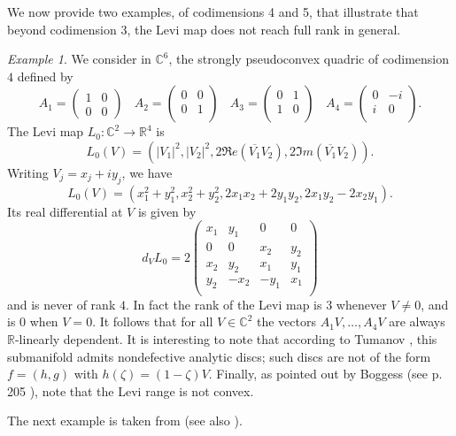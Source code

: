 \documentclass[12pt]{amsart}
\newcommand{\C}{\mathbb C}
\newcommand{\R}{\mathbb R}
\theoremstyle{remark}
\theoremstyle{example}
\newtheorem{example}[theo]{Example}
\theoremstyle{definition}
\numberwithin{equation}{section}
\begin{document}
We now provide two examples, of codimensions 4 and 5,  that illustrate that beyond codimension 3, the Levi map does not reach full rank in general. 

\begin{example}
We consider in $\C^6$, the strongly pseudoconvex quadric of codimension $4$ defined by  
$$A_1=
\begin{pmatrix}
	1& 0  \\ 0 &0  
\end{pmatrix} \ \ \ \ 
A_2=
\begin{pmatrix}
	0 & 0  \\  0 & 1 \\ 
\end{pmatrix}\ \ \ \ 
A_3=
\begin{pmatrix}
	0& 1  \\  1 & 0 \\
\end{pmatrix}\ \ \ \  
A_4=
\begin{pmatrix}
	0& -i  \\ i  & 0 \\
\end{pmatrix}.$$
The Levi map $L_0: \C^2 \to \R^4$ is 
$$L_0(V)=(|V_1|^2,|V_2|^2,2\Re e (\overline{V_1}V_2),2\Im m (\overline{V_1}V_2)).$$ 
Writing $V_j=x_j+iy_j$, we have  
$$L_0(V)=(x_1^2+y_1^2,x_2^2+y_2^2,2x_1x_2+2y_1y_2,2x_1y_2-2x_2y_1).$$  
Its real differential at $V$ is given by 
$$d_VL_0=2
\begin{pmatrix}
x_1& y_1 & 0 & 0     \\ 
0& 0  & x_2 & y_2   \\ 
x_2& y_2 &x_1 & y_1    \\ 
y_2& -x_2 & -y_1 & x_1 \\ 
\end{pmatrix}$$
and is never of rank $4$. In fact the rank of the Levi map is $3$ whenever $V\neq 0$, and is $0$ when $V=0$. It follows that for all $V\in \C^2$ the vectors $A_1V,\ldots,A_4V$ are always $\R$-linearly dependent. It is interesting to note that according to Tumanov \cite{tu3}, this submanifold admits nondefective analytic  discs; such discs are not of the form $f=(h,g)$ with $h(\zeta)=(1-\zeta)V$. Finally, as pointed out by Boggess (see p. 205 \cite{bo}), note that the Levi range is not convex.  
\end{example}


The next example is taken from \cite{me} (see also \cite{gr-me}). 
\end{document}

